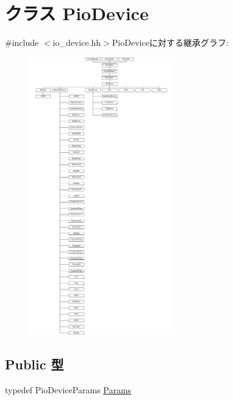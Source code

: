 \hypertarget{classPioDevice}{
\section{クラス PioDevice}
\label{classPioDevice}
}


{\ttfamily \#include $<$io\_\-device.hh$>$}PioDeviceに対する継承グラフ:\begin{figure}[H]
\begin{center}
\leavevmode
\includegraphics[height=12cm]{classPioDevice}
\end{center}
\end{figure}
\subsection*{Public 型}
\begin{DoxyCompactItemize}
\item 
typedef PioDeviceParams \hyperlink{classPioDevice_a9cdbda5b5cc24147ce82b7d07bf03cd1}{Params}
\end{DoxyCompactItemize}
